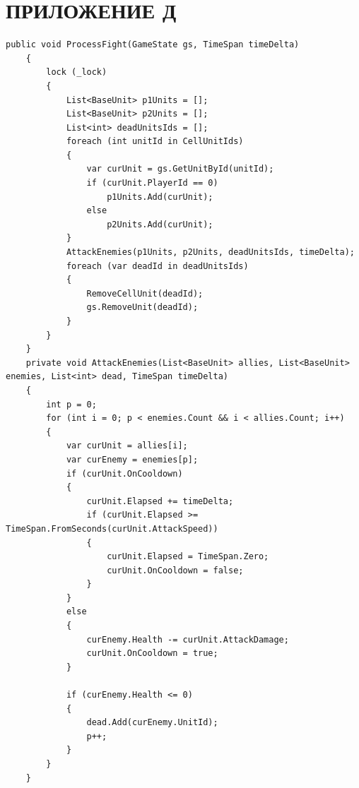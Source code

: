 \section*{ПРИЛОЖЕНИЕ Д}
\begin{lstlisting}[caption=Цикл сражения юнитов]
    public void ProcessFight(GameState gs, TimeSpan timeDelta)
    {
        lock (_lock)
        {
            List<BaseUnit> p1Units = [];
            List<BaseUnit> p2Units = [];
            List<int> deadUnitsIds = [];
            foreach (int unitId in CellUnitIds)
            {
                var curUnit = gs.GetUnitById(unitId);
                if (curUnit.PlayerId == 0)
                    p1Units.Add(curUnit);
                else
                    p2Units.Add(curUnit);
            }
            AttackEnemies(p1Units, p2Units, deadUnitsIds, timeDelta);
            foreach (var deadId in deadUnitsIds)
            {
                RemoveCellUnit(deadId);
                gs.RemoveUnit(deadId);
            }
        }
    }
    private void AttackEnemies(List<BaseUnit> allies, List<BaseUnit> enemies, List<int> dead, TimeSpan timeDelta)
    {
        int p = 0;
        for (int i = 0; p < enemies.Count && i < allies.Count; i++)
        {
            var curUnit = allies[i];
            var curEnemy = enemies[p];
            if (curUnit.OnCooldown)
            {
                curUnit.Elapsed += timeDelta;
                if (curUnit.Elapsed >= TimeSpan.FromSeconds(curUnit.AttackSpeed))
                {
                    curUnit.Elapsed = TimeSpan.Zero;
                    curUnit.OnCooldown = false;
                }
            }
            else
            {
                curEnemy.Health -= curUnit.AttackDamage;
                curUnit.OnCooldown = true;
            }
    
            if (curEnemy.Health <= 0)
            {
                dead.Add(curEnemy.UnitId);
                p++;
            }
        }
    }
\end{lstlisting}\label{app4}
